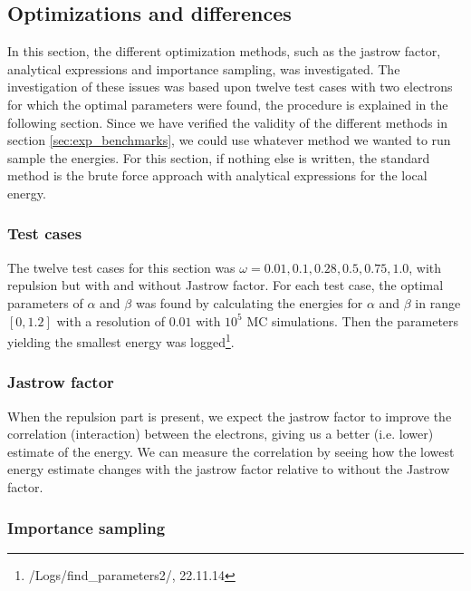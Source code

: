 \subsection{Optimizations and differences} \label{sec:exp_opt_and_diff}

In this section, the different optimization methods, such as the jastrow factor, analytical expressions and importance sampling, was investigated. 
The investigation of these issues was based upon twelve test cases with two electrons for which the optimal parameters were found, the procedure is explained in the following section.
Since we have verified the validity of the different methods in section \ref{sec:exp_benchmarks}, we could use whatever method we wanted to run sample the energies. 
For this section, if nothing else is written, the standard method is the brute force approach with analytical expressions for the local energy. 

\subsubsection{Test cases}\label{sec:exp_test_cases}

The twelve test cases for this section was $\omega = 0.01, 0.1, 0.28, 0.5, 0.75, 1.0$, with repulsion but with and without Jastrow factor.
For each test case, the optimal parameters of $\alpha$ and $\beta$ was found by calculating the energies for $\alpha$ and $\beta$ in range $[0,1.2]$ with a resolution of $0.01$ with $10^5$ MC simulations.
Then the parameters yielding the smallest energy was logged\footnote{/Logs/find\_parameters2/, 22.11.14}. 

\subsubsection{Jastrow factor}

When the repulsion part is present, we expect the jastrow factor to improve the correlation (interaction) between the electrons, giving us a better (i.e. lower) estimate of the energy. 
We can measure the correlation by seeing how the lowest energy estimate changes with the jastrow factor relative to without the Jastrow factor. 

\subsubsection{Importance sampling}

